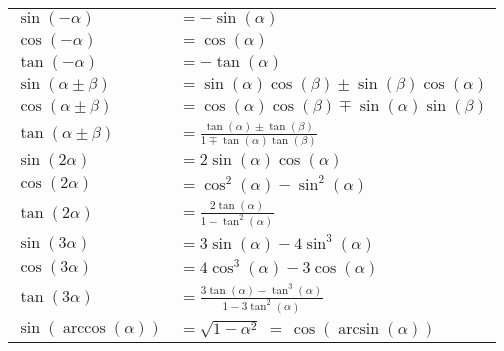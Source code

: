 \documentclass[a4paper,10pt]{scrartcl}
\begin{document}
\begin{multicols}{2}
	\renewcommand\arraystretch{1.3}
	\hspace{-25pt}
	\begin{tabular}{l l}
		
		$ \sin(-\alpha) $  &  $ = -\sin(\alpha) $ \\
		$ \cos(-\alpha) $  &  $ = \cos(\alpha) $ \\
		$ \tan(-\alpha) $  &  $ = -\tan(\alpha) $ \\
		$ \sin(\alpha \pm \beta) $  &  $ = \scriptstyle \sin(\alpha)\cos(\beta) \pm \sin(\beta)\cos(\alpha) $ \\
		$ \cos(\alpha \pm \beta) $  &  $ = \scriptstyle \cos(\alpha)\cos(\beta) \mp \sin(\alpha)\sin(\beta) $ \\
		$ \tan(\alpha \pm \beta) $  &  $ = \frac{\tan(\alpha) \pm \tan(\beta)}{1 \mp \tan(\alpha)\tan(\beta)} $ \\
		$ \sin(2\alpha) $  &  $ = 2 \sin(\alpha)\cos(\alpha) $ \\
		$ \cos(2\alpha) $  &  $ = \cos^2(\alpha) - \sin^2(\alpha) $ \\
		$ \tan(2\alpha) $  &  $ = \frac{2 \tan(\alpha)}{1-\tan^2(\alpha)} $ \\
		$ \sin(3\alpha) $  &  $ = 3\sin(\alpha)-4 \sin^3(\alpha) $ \\
		$ \cos(3\alpha) $  &  $ = 4\cos^3(\alpha) - 3 \cos(\alpha) $ \\
		$ \tan(3\alpha) $  &  $ = \frac{3 \tan(\alpha) - \tan^3(\alpha)}{1-3\tan^2(\alpha)} $ \\
		
		$ \sin(\arccos(\alpha)) $  &  $ =  \sqrt{1-\alpha^2} \; \scriptstyle = \, \cos(\arcsin(\alpha)) $
	\end{tabular}
	

\end{multicols}
\end{document}
